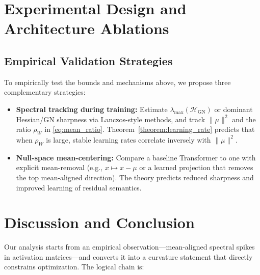 \documentclass[11pt]{article}
\begin{document}
\section{Experimental Design and Architecture Ablations}

\subsection{Empirical Validation Strategies}

To empirically test the bounds and mechanisms above, we propose three complementary strategies:

\begin{itemize}
  \item \textbf{Spectral tracking during training:} Estimate $\lambda_{\max}(\mathcal{H}_{\mathrm{GN}})$ or dominant Hessian/GN sharpness via Lanczos-style methods, and track $\|\mu\|^2$ and the ratio $\rho_W$ in \eqref{eq:mean_ratio}.
Theorem~\ref{theorem:learning_rate} predicts that when $\rho_W$ is large, stable learning rates correlate inversely with $\|\mu\|^2$.
  \item \textbf{Null-space mean-centering:} Compare a baseline Transformer to one with explicit mean-removal (e.g., $x\mapsto x-\mu$ or a learned projection that removes the top mean-aligned direction).
The theory predicts reduced sharpness and improved learning of residual semantics.
\end{itemize}

\section{Discussion and Conclusion}

Our analysis starts from an empirical observation---mean-aligned spectral spikes in activation matrices---and converts it into a curvature statement that directly constrains optimization.
The logical chain is:
\end{document}
